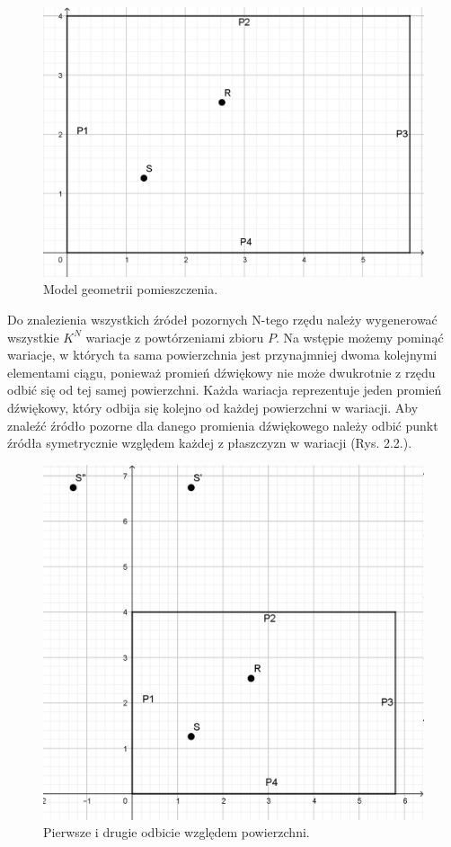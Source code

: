 \begin{figure}[h]
        \centering
                \centering
                \includegraphics[width=12cm]{rys1}
	\caption{Model geometrii pomieszczenia.}
\end{figure}

Do znalezienia wszystkich źródeł pozornych N-tego rzędu należy wygenerować wszystkie $K^N$ wariacje z powtórzeniami zbioru $P$. Na wstępie możemy pominąć wariacje, w których ta sama powierzchnia jest przynajmniej dwoma kolejnymi elementami ciągu, ponieważ promień dźwiękowy nie może dwukrotnie z rzędu odbić się od tej samej powierzchni. Każda wariacja reprezentuje jeden promień dźwiękowy, który odbija się kolejno od każdej powierzchni w wariacji. Aby znaleźć źródło pozorne dla danego promienia dźwiękowego należy odbić punkt źródła symetrycznie względem każdej z płaszczyzn w wariacji (Rys. 2.2.). 

\begin{figure}[h]
        \centering
                \centering
                \includegraphics[width=12cm]{rys2}
	\caption{Pierwsze i drugie odbicie względem powierzchni.}
\end{figure}

